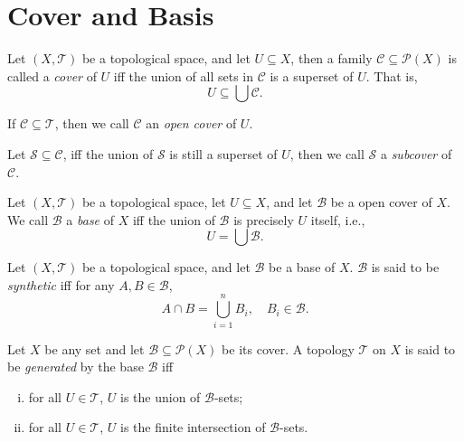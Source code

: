 \section{Cover and Basis}


\begin{definition}
	[cover]
	\label{def: cover}
	Let $(X, \mathcal T)$ be a topological space, and let $U \subseteq X$, then a family $\mathcal C \subseteq \mathcal P(X)$ is called a \textit{cover} of $U$ iff the union of all sets in $\mathcal C$ is a superset of $U$. That is,
	$$
	U \subseteq \bigcup \mathcal C.
	$$
	
	If $\mathcal C \subseteq \mathcal T$, then we call $\mathcal C$ an \textit{open cover} of $U$.
	
	Let $\mathcal S \subseteq \mathcal C$, iff the union of $\mathcal S$ is still a superset of $U$, then we call $\mathcal S$ a \textit{subcover} of $\mathcal C$.
\end{definition}


\begin{definition}
	[basis]
	\label{def: basis}
	Let $(X, \mathcal T)$ be a topological space, let $U \subseteq X$, and let $\mathcal B$ be a open cover of $X$. We call $\mathcal B$ a \textit{base} of $X$ iff the union of $\mathcal B$ is precisely $U$ itself, i.e.,
	$$
	U = \bigcup \mathcal B.
	$$
\end{definition}


\begin{definition}
	\label{def: synthetic basis}
	Let $(X, \mathcal T)$ be a topological space, and let $\mathcal B$ be a base of $X$. $\mathcal B$ is said to be \textit{synthetic} iff for any $A, B \in \mathcal B$,
	$$
	A \cap B = \bigcup_{i = 1}^{n} B_i, \quad B_i \in \mathcal B.
	$$
\end{definition}


\begin{definition}
	\label{def: generated by basis}
	Let $X$ be any set and let $\mathcal B \subseteq \mathcal P(X)$ be its cover. A topology $\mathcal T$ on $X$ is said to be \textit{generated} by the base $\mathcal B$ iff
	\begin{enumerate}[(i)]
		\item for all $U \in \mathcal T$, $U$ is the union of $\mathcal B$-sets;
		\item for all $U \in \mathcal T$, $U$ is the finite intersection of $\mathcal B$-sets.
	\end{enumerate}
\end{definition}


